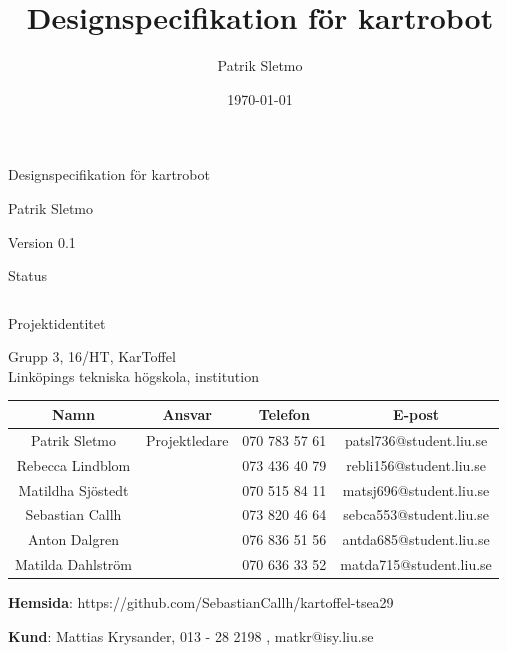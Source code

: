 \documentclass{article}
\title{Designspecifikation för kartrobot}
\author{Patrik Sletmo}
\date{\today}
\begin{document}
\thispagestyle{empty}

{
\sffamily
\centering
\large


{\huge 
Designspecifikation för kartrobot
}

{\large
Patrik Sletmo
}

{\large
Version 0.1
}

\vspace{3.5cm}

Status
\begin{center}
\begin{tabular}{ | c | c | c | } 
\hline
\end{tabular}
\end{center}
}
\clearpage

\vspace*{\fill}
{
\sffamily
\centering
\large


{\huge
Projektidentitet
}

{\large
Grupp 3, 16/HT, KarToffel \\ Linköpings tekniska högskola, institution
}

\vspace{0.5cm}

\begin{table}[H]
\centering
\begin{tabular}{ | c | c | c | c |}
\hline
Namn & Ansvar & Telefon & E-post \\
\hline
Patrik Sletmo & Projektledare & 070 783 57 61 & patsl736@student.liu.se \\
\hline
Rebecca Lindblom &  & 073 436 40 79 & rebli156@student.liu.se \\
\hline
Matildha Sjöstedt &  & 070 515 84 11 & matsj696@student.liu.se \\
\hline
Sebastian Callh &  & 073 820 46 64 & sebca553@student.liu.se \\
\hline
Anton Dalgren &  & 076 836 51 56 & antda685@student.liu.se \\
\hline
Matilda Dahlström &  & 070 636 33 52 & matda715@student.liu.se \\
\hline
\end{tabular}
\end{table}
}

\begin{center}
\textbf{Hemsida}: https://github.com/SebastianCallh/kartoffel-tsea29
\end{center}

\begin{center}
\textbf{Kund}: Mattias Krysander, 013 - 28 2198 , matkr@isy.liu.se
\end{center}
\end{document}
